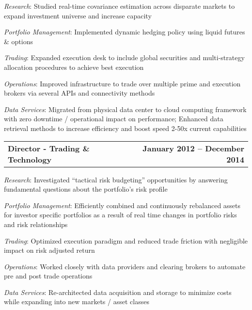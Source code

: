 \documentclass[11pt]{article}
\begin{document}
    \begin{list}{}{\leftmargin=1em}
      \item \textit{Research}: Studied real-time covariance estimation across
        disparate markets to expand investment universe and increase capacity
      \item \textit{Portfolio Management}: Implemented dynamic hedging policy using
        liquid futures \& options
      \item \textit{Trading}: Expanded execution desk to include global securities
        and multi-strategy allocation procedures to achieve best execution
      \item \textit{Operations}: Improved infrastructure to trade over
        multiple prime and execution brokers via several APIs and connectivity methods
      \item \textit{Data Services}: Migrated from physical data center to cloud
        computing framework with zero downtime / operational impact on performance;
        Enhanced data retrieval methods to increase efficiency and boost speed
        2-50x current capabilities
    \end{list}
  \begin{tabular*}{7.5in}{@{\extracolsep{\fill}}lr}
    \textbf{Director - Trading \& Technology} & \textbf{January 2012 -- December 2014}
  \end{tabular*}
    \begin{list}{}{\leftmargin=1em}
      \item \textit{Research}: Investigated ``tactical risk budgeting'' opportunities
        by answering fundamental questions about the portfolio's risk profile
      \item \textit{Portfolio Management}: Efficiently combined and continuously
        rebalanced assets for investor specific portfolios as a result of real
        time changes in portfolio risks and risk relationships
      \item \textit{Trading}: Optimized execution paradigm and reduced trade
        friction with negligible impact on risk adjusted return
      \item \textit{Operations}: Worked closely with data providers and clearing
        brokers to automate pre and post trade operations
      \item \textit{Data Services}: Re-architected data acquisition and storage
        to minimize costs while expanding into new markets / asset classes
    \end{list}
\end{document}
